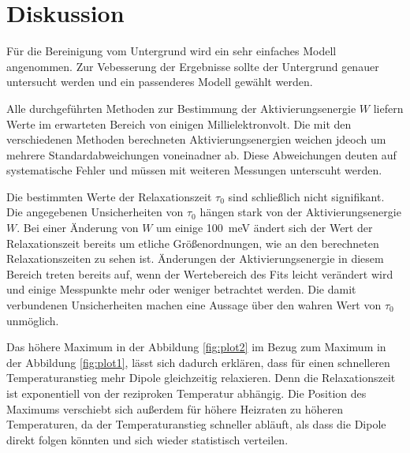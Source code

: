 \section{Diskussion}
\label{sec:Diskussion}

Für die Bereinigung vom Untergrund wird ein sehr einfaches Modell angenommen.
Zur Vebesserung der Ergebnisse sollte der Untergrund genauer untersucht werden und ein passenderes Modell gewählt werden.

Alle durchgeführten Methoden zur Bestimmung der Aktivierungsenergie $W$
liefern Werte im erwarteten Bereich von einigen Millielektronvolt.
Die mit den verschiedenen Methoden berechneten Aktivierungsenergien weichen jdeoch um mehrere Standardabweichungen voneinadner ab.
Diese Abweichungen deuten auf systematische Fehler und müssen mit weiteren Messungen unterscuht werden.

Die bestimmten Werte der Relaxationszeit $\tau_0$ sind schließlich nicht signifikant.
Die angegebenen Unsicherheiten von $\tau_0$ hängen stark von der Aktivierungsenergie $W$.
Bei einer Änderung von $W$ um einige \SI{100}{\milli\electronvolt} ändert
sich der Wert der Relaxationszeit bereits um etliche Größenordnungen, wie an den berechneten Relaxationszeiten zu sehen ist.
Änderungen der Aktivierungsenergie in diesem Bereich treten bereits auf, wenn der Wertebereich des Fits leicht verändert wird und einige Messpunkte mehr oder weniger betrachtet werden.
Die damit verbundenen Unsicherheiten machen eine Aussage über den wahren Wert von
$\tau_0$ unmöglich.

Das höhere Maximum in der Abbildung \ref{fig:plot2} im Bezug zum Maximum in der Abbildung \ref{fig:plot1}, lässt
sich dadurch erklären, dass für einen schnelleren Temperaturanstieg mehr Dipole gleichzeitig relaxieren.
Denn die Relaxationszeit ist exponentiell von der reziproken Temperatur abhängig.
Die Position des Maximums verschiebt sich außerdem für höhere Heizraten zu höheren Temperaturen, da der Temperaturanstieg
schneller abläuft, als dass die Dipole direkt folgen könnten und sich wieder statistisch verteilen.
